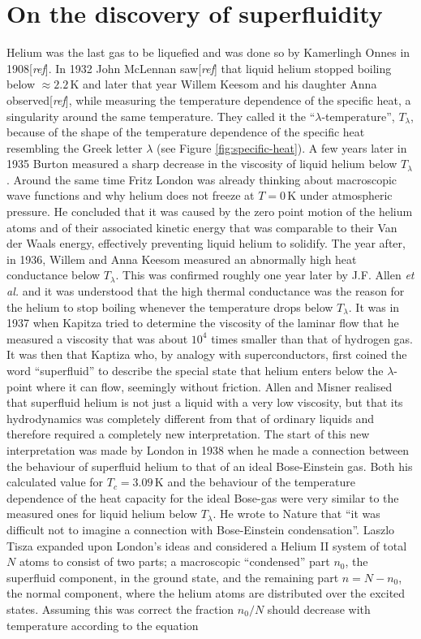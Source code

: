 \documentclass[11pt,a4paper,twoside]{article}
\newcommand{\unit}[1]{\,\mathrm{#1}}
\begin{document}
	\section{On the discovery of superfluidity}
		Helium was the last gas to be liquefied and was done so by Kamerlingh Onnes in 1908[\emph{ref}]. In 1932 John McLennan saw[\emph{ref}] that liquid helium stopped boiling below $\approx\!2.2\unit{K}$ and later that year Willem Keesom and his daughter Anna observed[\emph{ref}], while measuring  the temperature dependence of the specific heat, a singularity around the same temperature. They called it the ``$\lambda$-temperature'',  $T_\lambda$, because of the shape of the temperature dependence of the specific heat resembling the Greek letter $\lambda$ (see Figure \ref{fig:specific-heat}). A few years later in 1935 Burton measured a sharp decrease in the viscosity of liquid helium below $T_\lambda$. Around the same time Fritz London was already thinking about macroscopic wave functions and why helium does not freeze at $T=0\unit{K}$ under atmospheric pressure. He concluded that it was caused by the zero point motion of the helium atoms and of their associated kinetic energy that was comparable to their Van der Waals energy, effectively preventing liquid helium to solidify. The year after, in 1936, Willem and Anna Keesom measured an abnormally high heat conductance below $T_\lambda$. This was confirmed roughly one year later by J.F. Allen \emph{et al.} and it was understood that the high thermal conductance was the reason for the helium to stop boiling whenever the temperature drops below $T_\lambda$. It was in 1937 when Kapitza tried to determine the viscosity of the laminar flow that he measured a viscosity that was about $10^4$ times smaller than that of hydrogen gas. It was then that Kaptiza who, by analogy with superconductors, first coined the word ``superfluid'' to describe the special state that helium enters below the $\lambda$-point where it can flow, seemingly without friction. Allen and Misner realised that superfluid helium is not just a liquid with a very low viscosity, but that its hydrodynamics was completely different from that of ordinary liquids and therefore required a completely new interpretation. The start of this new interpretation was made by London in 1938 when he made a connection between the behaviour of superfluid helium to that of an ideal Bose-Einstein gas. Both his calculated value for $T_c=3.09\unit{K}$ and the behaviour of the temperature dependence of the heat capacity for the ideal Bose-gas were very similar to the measured ones for liquid helium below $T_\lambda$. He wrote to Nature that ``it was difficult not to imagine a connection with Bose-Einstein condensation''. Laszlo Tisza expanded upon London's ideas and considered a Helium II system of total $N$ atoms to consist of two parts; a macroscopic ``condensed'' part $n_0$, the superfluid component, in the ground state, and the remaining part $n=N-n_0$, the normal component, where the helium atoms are distributed over the excited states. Assuming this was correct the fraction $n_0/N$ should decrease with temperature according to the equation
\end{document}
